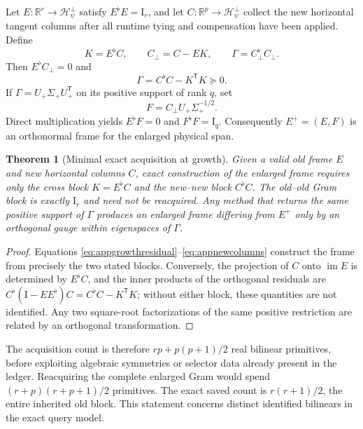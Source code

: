 \documentclass[10pt,twocolumn]{article}
\newtheorem{theorem}{Theorem}[section]
\theoremstyle{definition}
\theoremstyle{remark}
\newcommand{\R}{\mathbb R}
\newcommand{\Hh}{\mathcal H}
\newcommand{\Id}{\mathrm I}
\newcommand{\im}{\operatorname{im}}
\begin{document}
Let $E:\R^r\to\Hh_\psi^\perp$ satisfy $E^\flat E=\Id_r$, and let
$C:\R^p\to\Hh_\psi^\perp$ collect the new horizontal tangent columns after all
runtime tying and compensation have been applied.  Define
\begin{equation}
 K=E^\flat C,\qquad C_\perp=C-EK,\qquad
 \Gamma=C_\perp^\flat C_\perp.
 \label{eq:appgrowthresidual}
\end{equation}
Then $E^\flat C_\perp=0$ and
\begin{equation}
 \Gamma=C^\flat C-K^{\mathsf T}K\succeq0 .
 \label{eq:appschur}
\end{equation}
If $\Gamma=U_+\Sigma_+U_+^{\mathsf T}$ on its positive support of rank $q$,
set
\begin{equation}
 F=C_\perp U_+\Sigma_+^{-1/2}.
 \label{eq:appnewcolumns}
\end{equation}
Direct multiplication yields
$E^\flat F=0$ and $F^\flat F=\Id_q$.  Consequently $E^+=(E,F)$ is an
orthonormal frame for the enlarged physical span.

\begin{theorem}[Minimal exact acquisition at growth]
\label{thm:minimalgrowth}
Given a valid old frame $E$ and new horizontal columns $C$, exact construction
of the enlarged frame requires only the cross block $K=E^\flat C$ and the
new--new block $C^\flat C$.  The old--old Gram block is exactly
$\Id_r$ and need not be reacquired.  Any method that returns the same positive
support of $\Gamma$ produces an enlarged frame differing from $E^+$ only by
an orthogonal gauge within eigenspaces of $\Gamma$.
\end{theorem}
\begin{proof}
Equations \eqref{eq:appgrowthresidual}--\eqref{eq:appnewcolumns} construct the
frame from precisely the two stated blocks.  Conversely, the projection of
$C$ onto $\im E$ is determined by $E^\flat C$, and the inner products of the
orthogonal residuals are
$C^\flat(\Id-EE^\flat)C=C^\flat C-K^{\mathsf T}K$; without either block, these
quantities are not identified.  Any two square-root factorizations of the
same positive restriction are related by an orthogonal transformation.
\end{proof}

The acquisition count is therefore $rp+p(p+1)/2$ real bilinear primitives,
before exploiting algebraic symmetries or selector data already present in
the ledger.  Reacquiring the complete enlarged Gram
would spend $(r+p)(r+p+1)/2$ primitives.  The exact saved count is
$r(r+1)/2$, the entire inherited old block.  This statement concerns distinct
identified bilinears in the exact query model.
\end{document}
